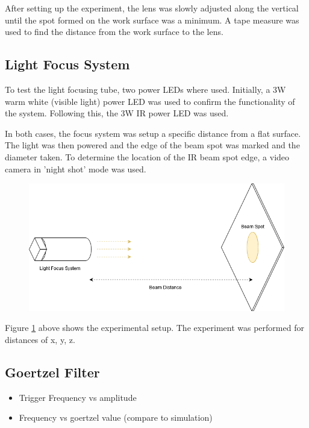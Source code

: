 After setting up the experiment, the lens was slowly adjusted along the vertical until the spot formed on the work surface was a minimum. A tape measure was used to find the distance from the work surface to the lens.

\subsection{Light Focus System}

To test the light focusing tube, two power LEDs where used. Initially, a 3W warm white (visible light) power LED was used to confirm the functionality of the system. Following this, the 3W IR power LED was used.

In both cases, the focus system was setup a specific distance from a flat surface. The light was then powered and the edge of the beam spot was marked and the diameter taken. To determine the location of the IR beam spot edge, a video camera in 'night shot' mode was used.

\begin{figure}[H]
	\centering
	\includegraphics[width=.7\linewidth]{figures/experimentation/beam_spot_experiement.png}
	\label{fig:focus_system_experiemnt}
\end{figure}

Figure \ref{fig:focus_system_experiemnt} above shows the experimental setup. The experiment was performed for distances of x, y, z.

\subsection{Goertzel Filter}

\begin{itemize}
	\item Trigger Frequency vs amplitude
	\item Frequency vs goertzel value (compare to simulation)
\end{itemize}
















